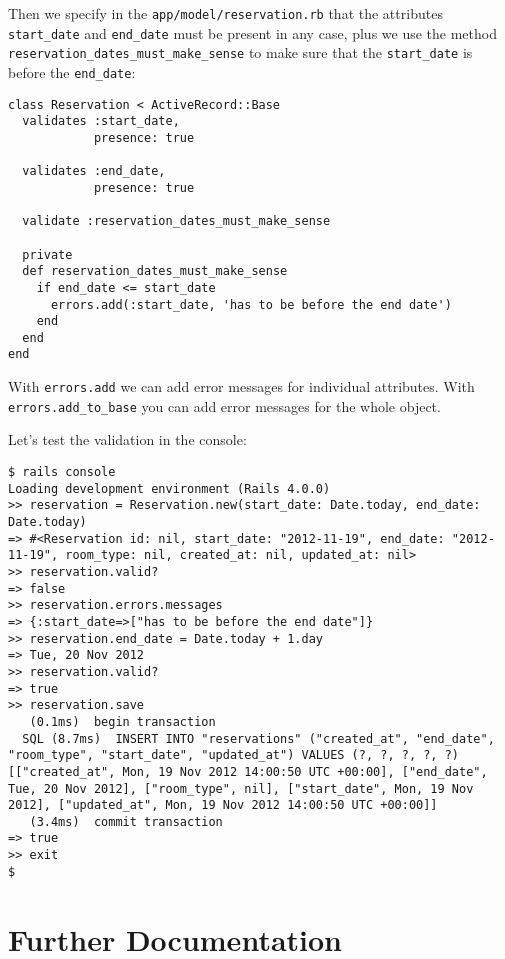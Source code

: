 \documentclass[a4paper]{book}
\begin{document}
Then we specify in the \texttt{app/model/reservation.rb} that the attributes \texttt{start\_date} and \texttt{end\_date} must be present in any case, plus we use the method \texttt{reservation\_dates\_must\_make\_sense} to make sure that the \texttt{start\_date} is before the \texttt{end\_date}:

\begin{shaded}\begin{verbatim}
class Reservation < ActiveRecord::Base
  validates :start_date,
            presence: true

  validates :end_date,
            presence: true

  validate :reservation_dates_must_make_sense

  private
  def reservation_dates_must_make_sense
    if end_date <= start_date
      errors.add(:start_date, 'has to be before the end date')
    end
  end
end
\end{verbatim}\end{shaded}

With \texttt{errors.add} we can add error messages for individual attributes. With \texttt{errors.add\_to\_base} you can add error messages for the whole object.

Let's test the validation in the console:

\begin{shaded}\begin{verbatim}
$ rails console
Loading development environment (Rails 4.0.0)
>> reservation = Reservation.new(start_date: Date.today, end_date: Date.today)
=> #<Reservation id: nil, start_date: "2012-11-19", end_date: "2012-11-19", room_type: nil, created_at: nil, updated_at: nil>
>> reservation.valid?
=> false
>> reservation.errors.messages
=> {:start_date=>["has to be before the end date"]}
>> reservation.end_date = Date.today + 1.day
=> Tue, 20 Nov 2012
>> reservation.valid?
=> true
>> reservation.save
   (0.1ms)  begin transaction
  SQL (8.7ms)  INSERT INTO "reservations" ("created_at", "end_date", "room_type", "start_date", "updated_at") VALUES (?, ?, ?, ?, ?)  [["created_at", Mon, 19 Nov 2012 14:00:50 UTC +00:00], ["end_date", Tue, 20 Nov 2012], ["room_type", nil], ["start_date", Mon, 19 Nov 2012], ["updated_at", Mon, 19 Nov 2012 14:00:50 UTC +00:00]]
   (3.4ms)  commit transaction
=> true
>> exit
$
\end{verbatim}\end{shaded}

\section{Further Documentation}\label{further-documentation}
\end{document}
